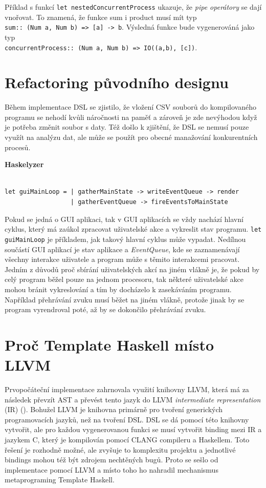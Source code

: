 \documentclass[male,czech]{kithesis}
\newcommand{\haskellInline}[1]{\colorbox{gray!10}{\texttt{#1}}}
\begin{document}
Příklad s funkcí \haskellInline{let nestedConcurrentProcess} ukazuje, 
že \textit{pipe operátory} se dají vnořovat. 
To znamená, 
že funkce sum i product musí mít typ \\
\haskellInline{sum:: (Num a, Num b) => [a] -> b}. 
Výsledná funkce bude vygenerováná jako typ \\
\haskellInline{concurrentProcess:: (Num a, Num b) => IO((a,b), [c])}.

\section{Refactoring původního designu}

Během implementace DSL se zjistilo,
že vložení CSV souborů do kompilovaného programu se nehodí
kvůli náročnosti na paměť a 
zároveň je zde nevýhodou když je potřeba změnit soubor s daty.
Též došlo k zjištění,
že DSL se nemusí pouze využít na analýzu dat,
ale může se použít pro obecné manažování konkurentních procesů.

\textbf{Haskelyzer}
\begin{verbatim}

let guiMainLoop = | gatherMainState -> writeEventQueue -> render
                  | gatherEventQueue -> fireEventsToMainState

\end{verbatim}

Pokud se jedná o GUI aplikaci,
tak v GUI aplikacích se vždy nachází hlavní cyklus,
který má zaúkol zpracovat uživatelské akce a 
vykreslit stav programu.
\haskellInline{let guiMainLoop} je příkladem,
jak takový hlavní cyklus může vypadat.
Nedílnou součástí GUI aplikací je stav aplikace a
\textit{EventQueue}, kde
se zaznamenávají všechny interakce uživatele a 
program může s těmito interakcemi pracovat.
Jedním z důvodů proč sbírání uživatelských akcí na jiném vlákně je,
že pokud by celý program běžel pouze na jednom procesoru,
tak některé uživatelské akce mohou bránit vykreslování a
tím by docházelo k zasekáváním programu.
Například přehrávání zvuku musí běžet na jiném vlákně,
protože jinak by se program vyrendroval poté,
až by se dokončilo přehrávání zvuku.

\section{Proč Template Haskell místo LLVM}

Prvopočáteční implementace zahrnovala využití knihovny LLVM,
která má za následek převzít AST a 
převést tento jazyk do LLVM \textit{intermediate representation} (IR) (\cite{IntroToLLVM}).
Bohužel LLVM je knihovna primárně pro tvoření generických programovacích jazyků, 
než na tvoření DSL. 
DSL se dá pomocí této knihovny vytvořit, 
ale pro každou vygenerovanou funkci se musí vytvořit binding mezi IR a
jazykem C, 
který je kompilován pomocí CLANG compileru a Haskellem. 
Toto řešení je rozhodně možné, 
ale zvyšuje to komplexitu projektu a 
jednotlivé bindings mohou též být zdrojem nechtěných bugů. 
Proto se sešlo od implementace pomocí LLVM a
místo toho ho nahradil mechanismus metaprograming Template Haskell.
\end{document}
